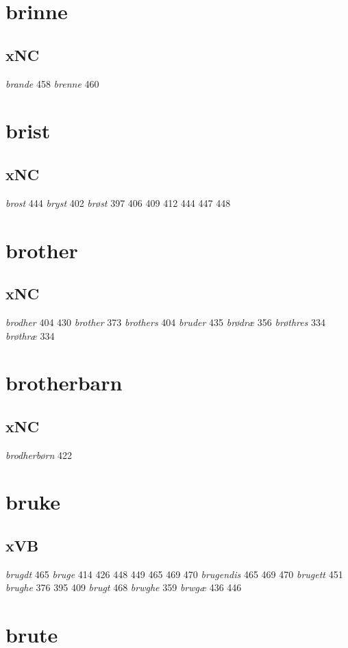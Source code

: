 \documentclass[a4paper,twocolumn]{article}
\begin{document}
\section{brinne}
\label{sec:orge22813e}
\subsection{xNC}
\label{sec:orgef0434d}
\emph{brande} 458 \emph{brenne} 460 
\section{brist}
\label{sec:org99aac9f}
\subsection{xNC}
\label{sec:org0d8cd7a}
\emph{brost} 444 \emph{bryst} 402 \emph{brøst} 397 406 409 412 444 447 448 
\section{brother}
\label{sec:org0904221}
\subsection{xNC}
\label{sec:org56496e8}
\emph{brodher} 404 430 \emph{brother} 373 \emph{brothers} 404 \emph{bruder} 435 \emph{brødræ} 356 \emph{brøthres} 334 \emph{brøthræ} 334 
\section{brotherbarn}
\label{sec:org982b019}
\subsection{xNC}
\label{sec:orgdcab802}
\emph{brodherbørn} 422 
\section{bruke}
\label{sec:org88c1083}
\subsection{xVB}
\label{sec:orgfe3c1b0}
\emph{brugdt} 465 \emph{bruge} 414 426 448 449 465 469 470 \emph{brugendis} 465 469 470 \emph{brugett} 451 \emph{brughe} 376 395 409 \emph{brugt} 468 \emph{brwghe} 359 \emph{brwgæ} 436 446 
\section{brute}
\label{sec:org4602509}
\end{document}
